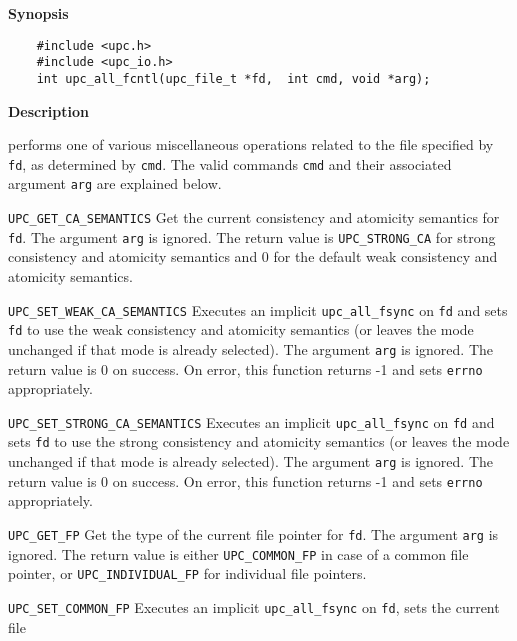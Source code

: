 \documentclass[12pt,titlepage]{article}
\newcounter{parnum}
\newcommand\np{\addtocounter{parnum}{1}\hspace{-2em}\makebox[2em][l]{\arabic{parnum}}}
\begin{document}
{\bf Synopsis}

\np\vspace{-2.5em}
\begin{verbatim}
    #include <upc.h>
    #include <upc_io.h>
    int upc_all_fcntl(upc_file_t *fd,  int cmd, void *arg);
\end{verbatim}

{\bf Description}

\np {\tt upc\_all\_fcntl} performs one of various miscellaneous operations related
to the file specified by {\tt fd}, as determined by {\tt cmd}. The valid commands {\tt cmd}
and their associated argument {\tt arg} are explained below.

\begin{description}
\item{\tt UPC\_GET\_CA\_SEMANTICS}
Get the current consistency and atomicity semantics for {\tt fd}. The 
argument {\tt arg} is ignored.
The return value is {\tt UPC\_STRONG\_CA} for strong consistency and atomicity 
semantics and 0 for the default weak consistency and atomicity semantics.
\item{\tt UPC\_SET\_WEAK\_CA\_SEMANTICS}
Executes an implicit {\tt upc\_all\_fsync} on {\tt fd} and sets {\tt fd} to use the weak 
consistency and atomicity semantics (or leaves the mode unchanged if that mode is already selected).
The argument {\tt arg} is ignored.
The return value is 0 on success. On error, this function returns 
-1 and sets {\tt errno} appropriately.
\item{\tt UPC\_SET\_STRONG\_CA\_SEMANTICS}
Executes an implicit {\tt upc\_all\_fsync} on {\tt fd} and sets {\tt fd} to use the strong 
consistency and atomicity semantics (or leaves the mode unchanged if that mode is already selected).
The argument {\tt arg} is ignored.
The return value is 0 on success. On error, this function returns 
-1 and sets {\tt errno} appropriately.
\item{\tt UPC\_GET\_FP}
Get the type of the current file pointer for {\tt fd}.
The argument {\tt arg} is ignored.
The return value is either {\tt UPC\_COMMON\_FP} in case of a common 
file pointer, or {\tt UPC\_INDIVIDUAL\_FP} for individual file pointers.
\item{\tt UPC\_SET\_COMMON\_FP}
Executes an implicit {\tt upc\_all\_fsync} on {\tt fd}, sets the current file

\end{description}
\end{document}
